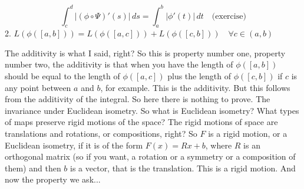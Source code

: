 \begin{math-stroke}
\[
\int_c^d |(\phi \circ \Psi)'(s)| \, ds = \int_a^b |\phi'(t)| \, dt \quad \text{(exercise)}
\]
2. $L(\phi([a,b])) = L(\phi([a,c])) + L(\phi([c,b])) \quad \forall c \in (a,b)$
\end{math-stroke}

\begin{spoken-clean}[17:52 - 20:10]
The additivity is what I said, right? So this is property number one, property number two, the additivity is that when you have the length of $\phi([a,b])$ should be equal to the length of $\phi([a,c])$ plus the length of $\phi([c,b])$ if $c$ is any point between $a$ and $b$, for example. This is the additivity. But this follows from the additivity of the integral. So here there is nothing to prove. The invariance under Euclidean isometry. So what is Euclidean isometry? What types of maps preserve rigid motions of the space? The rigid motions of space are translations and rotations, or compositions, right? So $F$ is a rigid motion, or a Euclidean isometry, if it is of the form $F(x) = Rx+b$, where $R$ is an orthogonal matrix (so if you want, a rotation or a symmetry or a composition of them) and then $b$ is a vector, that is the translation. This is a rigid motion. And now the property we ask...
\end{spoken-clean}